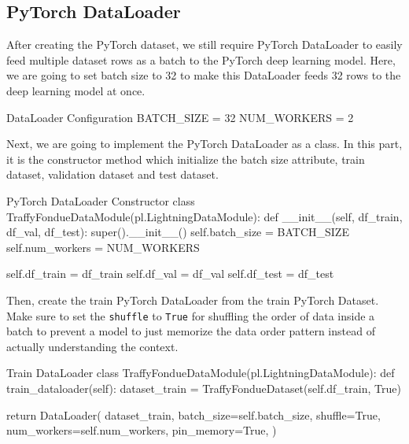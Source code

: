 \documentclass[12pt, a4paper]{article}
\begin{document}
    \pagebreak

            \subsection{PyTorch DataLoader}
                After creating the PyTorch dataset, we still require PyTorch DataLoader to easily feed multiple dataset rows
                as a batch to the PyTorch deep learning model. Here, we are going to set batch size to 32 to make this DataLoader
                feeds 32 rows to the deep learning model at once.

                \begin{codeblock}{DataLoader Configuration}
                    BATCH_SIZE = 32
                    NUM_WORKERS = 2
                \end{codeblock}

                Next, we are going to implement the PyTorch DataLoader as a class. In this part, it is the constructor method
                which initialize the batch size attribute, train dataset, validation dataset and test dataset.

                \begin{codeblock}{PyTorch DataLoader Constructor}
                    class TraffyFondueDataModule(pl.LightningDataModule):
                        def __init__(self, df_train, df_val, df_test):
                            super().__init__()
                            self.batch_size = BATCH_SIZE
                            self.num_workers = NUM_WORKERS

                            self.df_train = df_train
                            self.df_val = df_val
                            self.df_test = df_test
                \end{codeblock}

                Then, create the train PyTorch DataLoader from the train PyTorch Dataset.
                Make sure to set the \texttt{shuffle} to \texttt{True} for shuffling the order of data inside a batch
                to prevent a model to just memorize the data order pattern instead of actually understanding the context.
                \begin{codeblock}{Train DataLoader}
                    class TraffyFondueDataModule(pl.LightningDataModule):
                        def train_dataloader(self):
                            dataset_train = TraffyFondueDataset(self.df_train, True)

                            return DataLoader(
                                dataset_train,
                                batch_size=self.batch_size,
                                shuffle=True,
                                num_workers=self.num_workers,
                                pin_memory=True,
                            )
                \end{codeblock}
\end{document}
